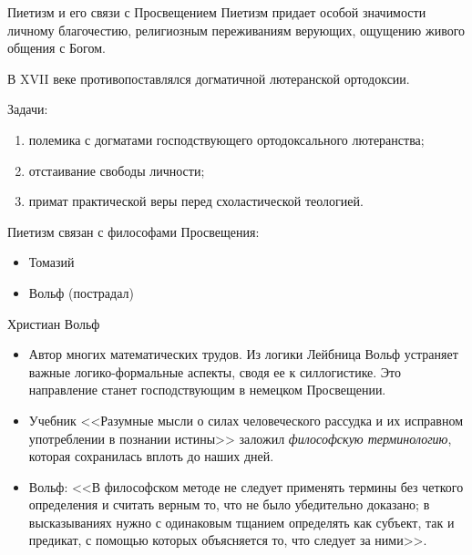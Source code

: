 \documentclass{beamer}
\begin{document}
    \begin{frame}{Пиетизм и его связи с Просвещением}
        Пиетизм придает особой значимости личному благочестию,
        религиозным переживаниям верующих, ощущению живого общения с Богом.

        В XVII веке противопоставлялся догматичной лютеранской ортодоксии.

        Задачи:
        \begin{enumerate}
        \item полемика с догматами господствующего ортодоксального лютеранства;
        \item отстаивание свободы личности;
        \item примат практической веры перед схоластической теологией.
        \end{enumerate}

        Пиетизм связан с философами Просвещения:
        \begin{itemize}
        \item Томазий
        \item Вольф (пострадал)
        \end{itemize}
    \end{frame}

    \begin{frame}{Христиан Вольф}
        \begin{itemize}
        \item Автор многих математических трудов.
            Из логики Лейбница Вольф устраняет важные логико-формальные аспекты,
            сводя ее к силлогистике.
            Это направление станет господствующим в немецком Просвещении.
        \item Учебник <<Разумные мысли о силах человеческого рассудка и
            их исправном употреблении в познании истины>> заложил
            \emph{философскую терминологию}, которая сохранилась
            вплоть до наших дней.
        \item Вольф: <<В философском методе не следует применять термины
            без четкого определения и считать верным то,
            что не было убедительно доказано;
            в высказываниях нужно с одинаковым тщанием определять как субъект,
            так и предикат, с помощью которых объясняется то,
            что следует за ними>>.
        \end{itemize}
    \end{frame}
\end{document}
